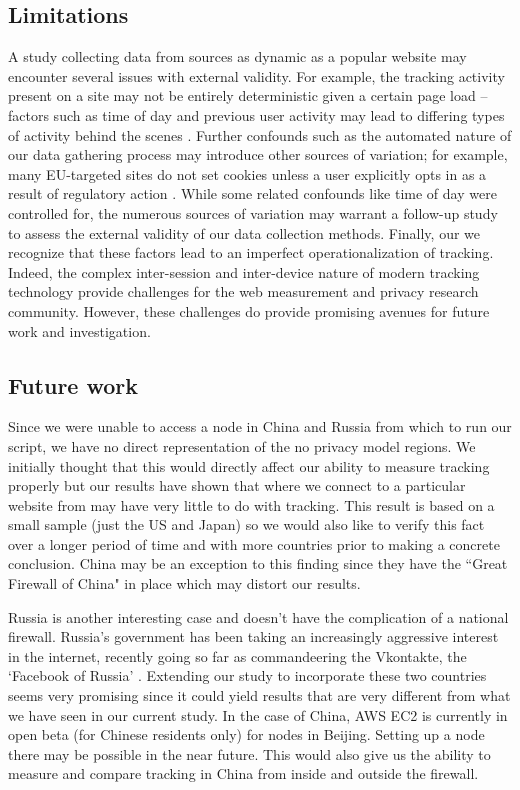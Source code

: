 \documentclass[conference]{IEEEtran}
\begin{document}
\subsection{Limitations}
A study collecting data from sources as dynamic as a popular website may encounter several issues with external validity. For example, the tracking activity present on a site may not be entirely deterministic given a certain page load -- factors such as time of day and previous user activity may lead to differing types of activity behind the scenes \cite{exchangewire}. Further confounds such as the automated nature of our data gathering process may introduce other sources of variation; for example, many EU-targeted sites do not set cookies unless a user explicitly opts in as a result of regulatory action \cite{ico}. While some related confounds like time of day were controlled for, the numerous sources of variation may warrant a follow-up study to assess the external validity of our data collection methods. Finally, our we recognize that these factors lead to an imperfect operationalization of tracking. Indeed, the complex inter-session and inter-device nature of modern tracking technology provide challenges for the web measurement and privacy research community. However, these challenges do provide promising avenues for future work and investigation.

\subsection{Future work}
Since we were unable to access a node in China and Russia from which to run our script, we have no direct representation of the no privacy model regions. We initially thought that this would directly affect our ability to measure tracking properly but our results have shown that where we connect to a particular website from may have very little to do with tracking. This result is based on a small sample (just the US and Japan) so we would also like to verify this fact over a longer period of time and with more countries prior to making a concrete conclusion. China may be an exception to this finding since they have the ``Great Firewall of China" in place which may distort our results.	

Russia is another interesting case and doesn't have the complication of a national firewall. Russia's government has been taking an increasingly aggressive interest in the internet, recently going so far as commandeering the Vkontakte, the `Facebook of Russia' \cite{toor}. Extending our study to incorporate these two countries seems very promising since it could yield results that are very different from what we have seen in our current study. In the case of China, AWS EC2 is currently in open beta (for Chinese residents only) for nodes in Beijing. Setting up a node there may be possible in the near future. This would also give us the ability to measure and compare tracking in China from inside and outside the firewall.
\end{document}

